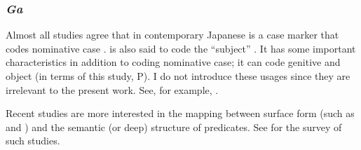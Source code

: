 \subsubsection{\textit{Ga}}

Almost all studies agree that
 in contemporary Japanese is a case marker that codes nominative case \cite[e.g.,][]{yamada36,kuno73,tanaka77,shibatani90}.
 is also said to code the ``subject'' \cite[e.g.,][164]{kuroda79}.
It has some important characteristics in addition to coding nominative case;
it can code genitive and object (in terms of this study, P).
I do not introduce these usages since they are irrelevant to the present work.
See, for example, \cite{ono75,nishida77,yasuda77,kuno73,shibatani01}.

Recent studies are more interested in the mapping between
surface form (such as  and )
and the semantic (or deep) structure of predicates.
See  for the survey of such studies.


